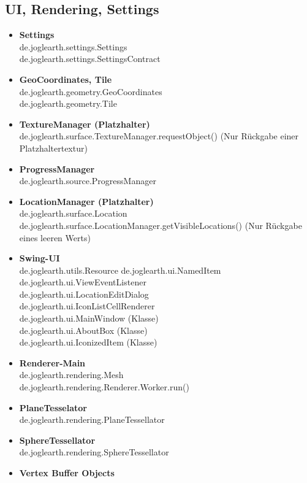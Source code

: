 \documentclass[10pt]{scrreprt}
\begin{document}
\subsection*{UI, Rendering, Settings}
\begin{itemize}
\item \textbf{Settings}\\
de.joglearth.settings.Settings\\
de.joglearth.settings.SettingsContract
\item \textbf{GeoCoordinates, Tile}\\
de.joglearth.geometry.GeoCoordinates\\
de.joglearth.geometry.Tile
\item \textbf{TextureManager (Platzhalter)}\\
de.joglearth.surface.TextureManager.requestObject() (Nur Rückgabe einer Platzhaltertextur)
\item \textbf{ProgressManager}\\
de.joglearth.source.ProgressManager
\item \textbf{LocationManager (Platzhalter)}\\
de.joglearth.surface.Location\\
de.joglearth.surface.LocationManager.getVisibleLocations() (Nur Rückgabe eines leeren Werts)
\item \textbf{Swing-UI}\\
de.joglearth.utils.Resource
de.joglearth.ui.NamedItem\\
de.joglearth.ui.ViewEventListener\\
de.joglearth.ui.LocationEditDialog\\
de.joglearth.ui.IconListCellRenderer\\
de.joglearth.ui.MainWindow (Klasse)\\
de.joglearth.ui.AboutBox (Klasse)\\
de.joglearth.ui.IconizedItem (Klasse)
\item \textbf{Renderer-Main}\\
de.joglearth.rendering.Mesh\\
de.joglearth.rendering.Renderer.Worker.run() 
\item \textbf{PlaneTesselator}\\
de.joglearth.rendering.PlaneTessellator
\item \textbf{SphereTessellator}\\
de.joglearth.rendering.SphereTessellator
\item \textbf{Vertex Buffer Objects}\\

\end{itemize}
\end{document}
